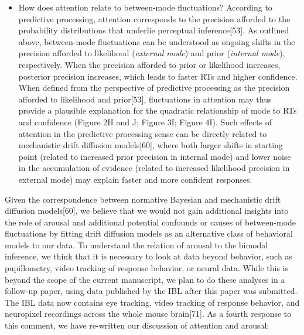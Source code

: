 \documentclass[
]{article}
\providecommand{\tightlist}{%
  \setlength{\itemsep}{0pt}\setlength{\parskip}{0pt}}
\begin{document}
\begin{itemize}
\tightlist
\item
  How does attention relate to between-mode fluctuations? According to
  predictive processing, attention corresponds to the precision afforded
  to the probability distributions that underlie perceptual
  inference{[}53{]}. As outlined above, between-mode fluctuations can be
  understood as ongoing shifts in the precision afforded to likelihood
  (\emph{external mode}) and prior (\emph{internal mode}), respectively.
  When the precision afforded to prior or likelihood increases,
  posterior precision increases, which leads to faster RTs and higher
  confidence. When defined from the perspective of predictive processing
  as the precision afforded to likelihood and prior{[}53{]},
  fluctuations in attention may thus provide a plausible explanation for
  the quadratic relationship of mode to RTs and confidence (Figure 2H
  and J; Figure 3I; Figure 4I). Such effects of attention in the
  predictive processing sense can be directly related to mechanistic
  drift diffusion models{[}60{]}, where both larger shifts in starting
  point (related to increased prior precision in internal mode) and
  lower noise in the accumulation of evidence (related to increased
  likelihood precision in external mode) may explain faster and more
  confident responses.
\end{itemize}

Given the correspondence between normative Bayesian and mechanistic
drift diffusion models{[}60{]}, we believe that we would not gain
additional insights into the role of arousal and additional potential
confounds or causes of between-mode fluctuations by fitting drift
diffusion models as an alternative class of behavioral models to our
data. To understand the relation of arousal to the bimodal inference, we
think that it is necessary to look at data beyond behavior, such as
pupillometry, video tracking of response behavior, or neural data. While
this is beyond the scope of the current manuscript, we plan to do these
analyses in a follow-up paper, using data published by the IBL after
this paper was submitted. The IBL data now contains eye tracking, video
tracking of response behavior, and neuropixel recordings across the
whole mouse brain{[}71{]}. As a fourth response to this comment, we have
re-written our discussion of attention and arousal:
\end{document}
